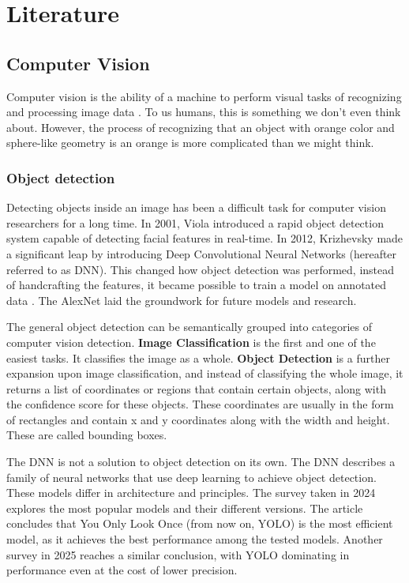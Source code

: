 \chapter{Literature}

\section{Computer Vision}
\label{ComputerVision}
Computer vision is the ability of a machine to perform visual tasks of recognizing and processing image data \cite{computerVisionIBM}. To us humans, this is something we don't even think about. However, the process of recognizing that an object with orange color and sphere-like geometry is an orange is more complicated than we might think.

\subsection{Object detection}

Detecting objects inside an image has been a difficult task for computer vision researchers for a long time. In 2001, Viola \cite{viola} introduced a rapid object detection system capable of detecting facial features in real-time. In 2012, Krizhevsky \cite{krizhevsky} made a significant leap by introducing Deep Convolutional Neural Networks (hereafter referred to as DNN). This changed how object detection was performed, instead of handcrafting the features, it became possible to train a model on annotated data \cite{Xue2024ObjectDetection}. The AlexNet \cite{krizhevsky} laid the groundwork for future models and research.

The general object detection can be semantically grouped into categories of computer vision detection. \textbf{Image Classification} \cite{imageClassificationIBM} is the first and one of the easiest tasks. It classifies the image as a whole. \textbf{Object Detection} \cite{objectDetectionIBM} is a further expansion upon image classification, and instead of classifying the whole image, it returns a list of coordinates or regions that contain certain objects, along with the confidence score for these objects. These coordinates are usually in the form of rectangles and contain x and y coordinates along with the width and height. These are called bounding boxes.

The DNN is not a solution to object detection on its own. The DNN describes a family of neural networks that use deep learning to achieve object detection. These models differ in architecture and principles. The survey taken in 2024 \cite{objectDetectionSurver2024} explores the most popular models and their different versions. The article concludes that You Only Look Once (from now on, YOLO) is the most efficient model, as it achieves the best performance among the tested models. Another survey in 2025 reaches a similar conclusion, with YOLO dominating in performance even at the cost of lower precision.

